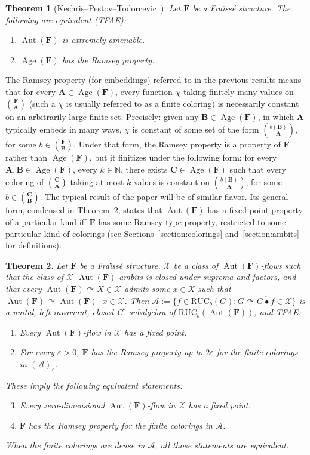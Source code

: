 \documentclass[11pt]{article}
\newtheorem{theo}{Theorem}[section]
\theoremstyle{definition}
\numberwithin{equation}{section}
\numberwithin{figure}{section}
\numberwithin{table}{section}
\newcommand{\A}{\mathcal A}
\newcommand{\N}{\mathbb{N}}
\newcommand*{\mA}{\mathbf{A}}
\newcommand*{\mB}{\mathbf{B}}
\newcommand*{\mC}{\mathbf{C}}
\newcommand*{\mF}{\mathbf{F}}
\newcommand{\e}{\varepsilon}
\DeclareMathOperator{\Aut}{Aut}
\DeclareMathOperator{\Age}{Age}
\newcommand{\actson}{\curvearrowright}
\newcommand{\RUCB}{\mathrm{RUC}_{b}}
\begin{document}
\begin{theo}[Kechris--Pestov--Todorcevic~\cite{KPT}]\label{thm:KPT}
Let $\mF$ be a Fra\"{\i}ss\'e structure. The following are equivalent (TFAE):
\begin{enumerate}
\item $\Aut(\mF)$ is extremely amenable.
\item $\Age(\mF)$ has the Ramsey property.
\end{enumerate}
\end{theo}

The Ramsey property (for embeddings) referred to in the previous results means that for every $\mA\in \Age(\mF)$, every function $\chi$ taking finitely many values on $\binom{\mF}{\mA}$ (such a $\chi$ is usually referred to as a finite coloring) is necessarily constant on an arbitrarily large finite set. Precisely: given any $\mB \in \Age(\mF)$, in which $\mA$ typically embeds in many ways, $\chi$ is constant of some set of the form $\binom{b(\mB)}{\mA}$, for some $b\in \binom{\mF}{\mB}$. Under that form, the Ramsey property is a property of $\mF$ rather than $\Age(\mF)$, but it finitizes under the following form: for every $\mA, \mB\in \Age(\mF)$, every $k\in \N$, there exists $\mC\in \Age(\mF)$ such that every coloring of $\binom{\mC}{\mA}$ taking at most $k$ values is constant on $\binom{b(\mB)}{\mA}$, for some $b\in \binom{\mC}{\mB}$. The typical result of the paper will be of similar flavor. Its general form, condensed in Theorem~\ref{thm:fpRP}, states that $\Aut(\mF)$ has a fixed point property of a particular kind iff $\mF$ has some Ramsey-type property, restricted to some particular kind of colorings (see Sections~\ref{section:colorings} and~\ref{section:ambits} for definitions):

\begin{theo}\label{thm:fpRP}
Let $\mF$ be a Fra\"{\i}ss\'e structure, $\mathcal X$ be a class of $\Aut(\mF)$-flows such that the class of $\mathcal X$-$\Aut(\mF)$-ambits is closed under suprema and factors, and that every $\Aut(\mF)\actson X\in \mathcal X$ admits some $x\in X$ such that $\Aut(\mF)\actson \overline{\Aut(\mF)\cdot x}\in \mathcal X$. Then $\A:=\{ f\in \RUCB(G) : G\actson \overline{G\bullet f} \in \mathcal X\}$ is a unital, left-invariant, closed C$^{*}$-subalgebra of $\RUCB(\Aut(\mF))$, and TFAE:
\begin{enumerate}
\item Every $\Aut(\mF)$-flow in $\mathcal X$ has a fixed point.
\item For every $\e>0$, $\mF$ has the Ramsey property up to $2\e$ for the finite colorings in $(\A)_{\e}$.
\end{enumerate}

These imply the following equivalent statements:
\begin{enumerate}
\setcounter{enumi}{2}
\item Every zero-dimensional $\Aut(\mF)$-flow in $\mathcal X$ has a fixed point.
\item $\mF$ has the Ramsey property for the finite colorings in $\A$.
\end{enumerate}

When the finite colorings are dense in $\A$, all those statements are equivalent.
\end{theo}
\end{document}
